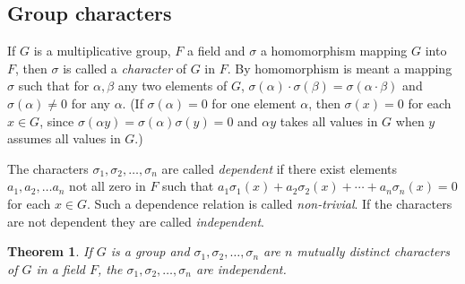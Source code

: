\documentclass[10pt,leqno]{article}
\newtheorem{theo}{Theorem}
\theoremstyle{definition}
\begin{document}
\subsection{Group characters}

If $G$ is a multiplicative group, $F$ a field and $\sigma$ a homomorphism mapping $G$ into $F$, then $\sigma$ is called a \emph{character} of $G$ in $F$.
By homomorphism is meant a mapping $\sigma$ such that for $\alpha, \beta$ any two elements of $G$, $\sigma(\alpha) \cdot \sigma(\beta) = \sigma(\alpha \cdot \beta)$ and $\sigma(\alpha) \not= 0$ for any $\alpha$.
(If $\sigma(\alpha) = 0$ for one element $\alpha$, then $\sigma(x) = 0$ for each $x \in G$, since $\sigma(\alpha y) = \sigma(\alpha) \sigma(y) = 0$ and $\alpha y$ takes all values in $G$ when $y$ assumes all values in $G$.)

The characters $\sigma_1, \sigma_2, \ldots, \sigma_n$ are called \emph{dependent} if there exist elements $a_1, a_2, \ldots a_n$ not all zero in $F$ such that $a_1 \sigma_1(x) + a_2 \sigma_2(x) + \cdots + a_n \sigma_n(x) = 0$ for each $x \in G$.
Such a dependence relation is called \emph{non-trivial}.
If the characters are not dependent they are called \emph{independent}.


\begin{theo}
\label{theo:ontw}
If $G$ is a group and $\sigma_1, \sigma_2, \ldots, \sigma_n$ are $n$ mutually distinct characters of $G$ in a field $F$, the $\sigma_1, \sigma_2, \ldots, \sigma_n$ are independent.
\end{theo}
\end{document}
